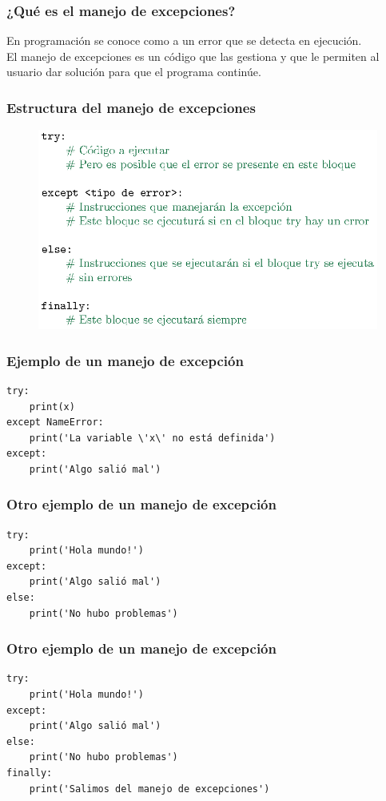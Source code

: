 \documentclass[12pt]{beamer}
\begin{document}
\begin{frame}
\frametitle{¿Qué es el manejo de excepciones?}
En programación se conoce como  a un error que se detecta en ejecución.
\\
\bigskip
\pause
El manejo de excepciones es un código que las gestiona y que le permiten al usuario dar solución para que el programa continúe.
\end{frame}
\begin{frame}[fragile]
\frametitle{Estructura del manejo de excepciones}
\begin{figure}
    \centering
    \includegraphics[scale=0.95]{Imagenes/Manejo_Excepciones_01.eps}
\end{figure}
\end{frame}
\begin{frame}[fragile]
\frametitle{Ejemplo de un manejo de excepción}
\begin{lstlisting}[caption=Un error por la variable x no definida]
try:
    print(x)
except NameError:
    print('La variable \'x\' no está definida')
except:
    print('Algo salió mal')
\end{lstlisting}
\end{frame}
\begin{frame}[fragile]
\frametitle{Otro ejemplo de un manejo de excepción}
\begin{lstlisting}[caption=Manejo con un else]
    try:
    print('Hola mundo!')
except:
    print('Algo salió mal')
else:
    print('No hubo problemas')
\end{lstlisting}
\end{frame}
\begin{frame}[fragile]
\frametitle{Otro ejemplo de un manejo de excepción}
\begin{lstlisting}[caption=Manejo con un else]
try:
    print('Hola mundo!')
except:
    print('Algo salió mal')
else:
    print('No hubo problemas')
finally:
    print('Salimos del manejo de excepciones')
\end{lstlisting}
\end{frame}
\end{document}
